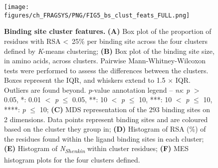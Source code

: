 {\begin{figure}[htb!]
    \centering
    \texttt{[image: figures/ch\_FRAGSYS/PNG/FIG5\_bs\_clust\_feats\_FULL.png]}
    \caption[Binding site cluster features]{\textbf{Binding site cluster features.} \textbf{(A)} Box plot of the proportion of residues with RSA \textless~25\% per binding site across the four clusters defined by \textit{K}-means clustering; \textbf{(B)} Box plot of the binding site size, in amino acids, across clusters. Pairwise Mann-Whitney-Wilcoxon tests were performed to assess the differences between the clusters. Boxes represent the IQR, and whiskers extend to 1.5 $\times$ IQR. Outliers are found beyond. \textit{p}-value annotation legend -- \textit{ns}: \textit{p} $>$ 0.05, *: 0.01 $<$ \textit{p} $\leq$ 0.05, **: 10\textsuperscript{} $<$ \textit{p} $\leq$ 10\textsuperscript{}, ***: 10\textsuperscript{} $<$ \textit{p} $\leq$ 10\textsuperscript{}, ****: \textit{p} $\leq$ 10\textsuperscript{}; \textbf{(C)} MDS representation of the 293 binding sites on 2 dimensions. Data points represent binding sites and are coloured based on the cluster they group in; \textbf{(D)} Histogram of RSA (\%) of the residues found within the ligand binding sites in each cluster; \textbf{(E)} Histogram of \textit{N\textsubscript{Shenkin}} within cluster residues; \textbf{(F)} MES histogram plots for the four clusters defined.}
    \label{fig:bs_clusts_feats}
\end{figure}

}
